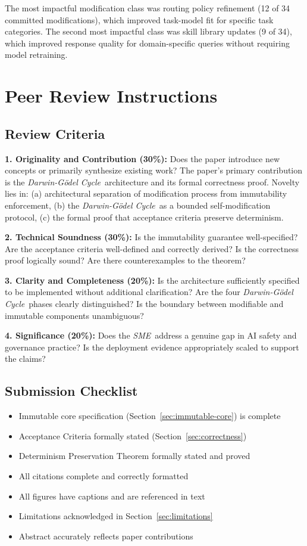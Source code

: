 \documentclass[12pt]{article}
\newcommand{\sme}{\textit{SME}}
\newcommand{\dgcycle}{\textit{Darwin-G\"odel Cycle}}
\begin{document}
The most impactful modification class was routing policy refinement (12 of 34 committed modifications), which improved task-model fit for specific task categories. The second most impactful class was skill library updates (9 of 34), which improved response quality for domain-specific queries without requiring model retraining.

\section*{Peer Review Instructions}
\label{sec:peer-review}

\subsection*{Review Criteria}

\textbf{1. Originality and Contribution (30\%):} Does the paper introduce new concepts or primarily synthesize existing work? The paper's primary contribution is the \dgcycle\ architecture and its formal correctness proof. Novelty lies in: (a) architectural separation of modification process from immutability enforcement, (b) the \dgcycle\ as a bounded self-modification protocol, (c) the formal proof that acceptance criteria preserve determinism.

\textbf{2. Technical Soundness (30\%):} Is the immutability guarantee well-specified? Are the acceptance criteria well-defined and correctly derived? Is the correctness proof logically sound? Are there counterexamples to the theorem?

\textbf{3. Clarity and Completeness (20\%):} Is the architecture sufficiently specified to be implemented without additional clarification? Are the four \dgcycle\ phases clearly distinguished? Is the boundary between modifiable and immutable components unambiguous?

\textbf{4. Significance (20\%):} Does the \sme\ address a genuine gap in AI safety and governance practice? Is the deployment evidence appropriately scaled to support the claims?

\subsection*{Submission Checklist}

\begin{itemize}
    \item[ ] Immutable core specification (Section~\ref{sec:immutable-core}) is complete
    \item[ ] Acceptance Criteria formally stated (Section~\ref{sec:correctness})
    \item[ ] Determinism Preservation Theorem formally stated and proved
    \item[ ] All citations complete and correctly formatted
    \item[ ] All figures have captions and are referenced in text
    \item[ ] Limitations acknowledged in Section~\ref{sec:limitations}
    \item[ ] Abstract accurately reflects paper contributions
\end{itemize}
\end{document}
